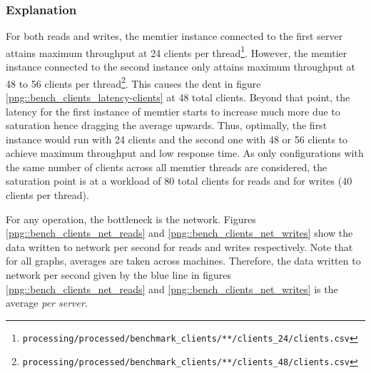 \documentclass[11pt,a4paper]{article}
\begin{document}
\subsubsection{Explanation}
For both reads and writes, the memtier instance connected to the first server attains maximum throughput at 24 clients per thread\footnote{\texttt{processing/processed/benchmark_clients/**/clients_24/clients.csv}}. However, the memtier instance connected to the second instance only attains maximum throughput at 48 to 56 clients per thread\footnote{\texttt{processing/processed/benchmark_clients/**/clients_48/clients.csv}}. This causes the dent in figure \ref{png::bench_clients_latency-clients} at 48 total clients. Beyond that point, the latency for the first instance of memtier starts to increase much more due to saturation hence dragging the average upwards. Thus, optimally, the first instance would run with 24 clients and the second one with 48 or 56 clients to achieve maximum throughput and low response time. As only configurations with the same number of clients across all memtier threads are considered, the saturation point is at a workload of 80 total clients for reads and for writes (40 clients per thread).

For any operation, the bottleneck is the network. Figures \ref{png::bench_clients_net_reads} and \ref{png::bench_clients_net_writes} show the data written to network per second for reads and writes respectively. Note that for all graphs, averages are taken across machines. Therefore, the data written to network per second given by the blue line in figures \ref{png::bench_clients_net_reads} and \ref{png::bench_clients_net_writes} is the average \textit{per server}.
\end{document}
